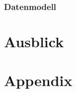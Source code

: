 \documentclass[12pt,twoside]{book}
\let\cleardoublepage\clearpage
\begin{document}
\subsection{Datenmodell}

\chapter{Ausblick}

\chapter{Appendix}

\cleardoublepage
{}

\printbibliography

\cleardoublepage
{}
\end{document}
